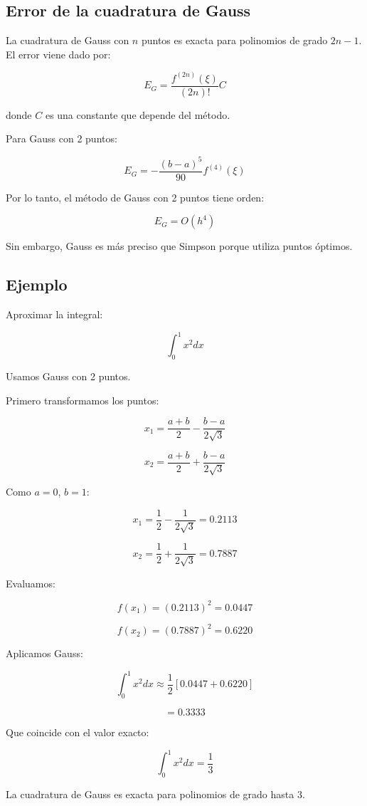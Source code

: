 \documentclass[12pt,a4paper]{article}
\begin{document}
\subsection{Error de la cuadratura de Gauss}

La cuadratura de Gauss con $n$ puntos es exacta para polinomios de grado $2n-1$.
El error viene dado por:

\[
E_G = \frac{f^{(2n)}(\xi)}{(2n)!} C
\]

donde $C$ es una constante que depende del método.

Para Gauss con 2 puntos:

\[
E_G = -\frac{(b-a)^5}{90} f^{(4)}(\xi)
\]

Por lo tanto, el método de Gauss con 2 puntos tiene orden:

\[
E_G = O(h^4)
\]

Sin embargo, Gauss es más preciso que Simpson porque utiliza puntos óptimos.

\subsection{Ejemplo}

Aproximar la integral:

\[
\int_0^1 x^2 dx
\]

Usamos Gauss con 2 puntos.

Primero transformamos los puntos:

\[
x_1 = \frac{a+b}{2} - \frac{b-a}{2\sqrt{3}}
\]

\[
x_2 = \frac{a+b}{2} + \frac{b-a}{2\sqrt{3}}
\]

Como $a=0$, $b=1$:

\[
x_1 = \frac{1}{2} - \frac{1}{2\sqrt{3}} = 0.2113
\]

\[
x_2 = \frac{1}{2} + \frac{1}{2\sqrt{3}} = 0.7887
\]

Evaluamos:

\[
f(x_1) = (0.2113)^2 = 0.0447
\]

\[
f(x_2) = (0.7887)^2 = 0.6220
\]

Aplicamos Gauss:

\[
\int_0^1 x^2 dx \approx \frac{1}{2} [0.0447 + 0.6220]
\]

\[
= 0.3333
\]

Que coincide con el valor exacto:

\[
\int_0^1 x^2 dx = \frac{1}{3}
\]

La cuadratura de Gauss es exacta para polinomios de grado hasta 3.
\end{document}
